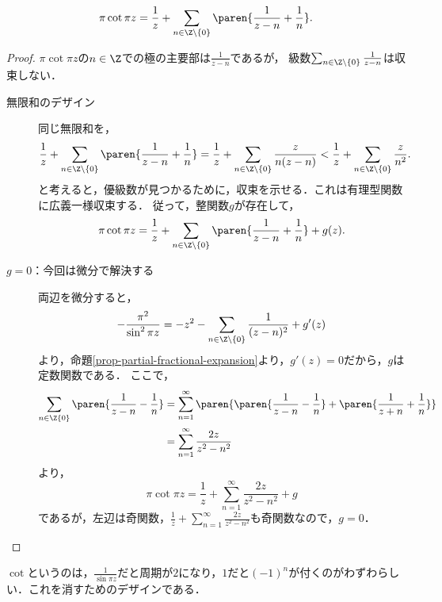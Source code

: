 \documentclass[uplatex, dvipdfmx]{jsreport}
\begin{document}
\begin{proposition}[次に１位の極を持つもの]
    \[\pi\cot\pi z=\frac{1}{z}+\sum_{n\in\Z\setminus\{0\}}\paren{\frac{1}{z-n}+\frac{1}{n}}.\]
\end{proposition}
\begin{proof}
    $\pi\cot\pi z$の$n\in\Z$での極の主要部は$\frac{1}{z-n}$であるが，
    級数$\sum_{n\in\Z\setminus\{0\}}\frac{1}{z-n}$は収束しない．
    \begin{description}
        \item[無限和のデザイン] 同じ無限和を，
        \[\frac{1}{z}+\sum_{n\in\Z\setminus\{0\}}\paren{\frac{1}{z-n}+\frac{1}{n}}=\frac{1}{z}+\sum_{n\in\Z\setminus\{0\}}\frac{z}{n(z-n)}<\frac{1}{z}+\sum_{n\in\Z\setminus\{0\}}\frac{z}{n^2}.\]
        と考えると，優級数が見つかるために，収束を示せる．これは有理型関数に広義一様収束する．
        従って，整関数$g$が存在して，
        \[\pi\cot\pi z=\frac{1}{z}+\sum_{n\in\Z\setminus\{0\}}\paren{\frac{1}{z-n}+\frac{1}{n}}+g(z).\]
        \item[$g=0$：今回は微分で解決する]
        両辺を微分すると，
        \[-\frac{\pi^2}{\sin^2\pi z}=-z^2-\sum_{n\in\Z\setminus\{0\}}\frac{1}{(z-n)^2}+g'(z)\]
        より，命題\ref{prop-partial-fractional-expansion}より，$g'(z)=0$だから，$g$は定数関数である．
        ここで，
        \begin{align*}
            \sum_{n\in\Z\{0\}}\paren{\frac{1}{z-n}-\frac{1}{n}}&=\sum^\infty_{n=1}\paren{\paren{\frac{1}{z-n}-\frac{1}{n}}+\paren{\frac{1}{z+n}+\frac{1}{n}}}\\
            &=\sum^\infty_{n=1}\frac{2z}{z^2-n^2}
        \end{align*}
        より，
        \[\pi\cot\pi z=\frac{1}{z}+\sum^\infty_{n=1}\frac{2z}{z^2-n^2}+g\]
        であるが，左辺は奇関数，$\frac{1}{z}+\sum^\infty_{n=1}\frac{2z}{z^2-n^2}$も奇関数なので，$g=0$．
    \end{description}
\end{proof}
\begin{remarks}
    $\cot$というのは，$\frac{1}{\sin\pi z}$だと周期が$2$になり，$1$だと$(-1)^n$が付くのがわずわらしい．これを消すためのデザインである．
\end{remarks}
\end{document}
